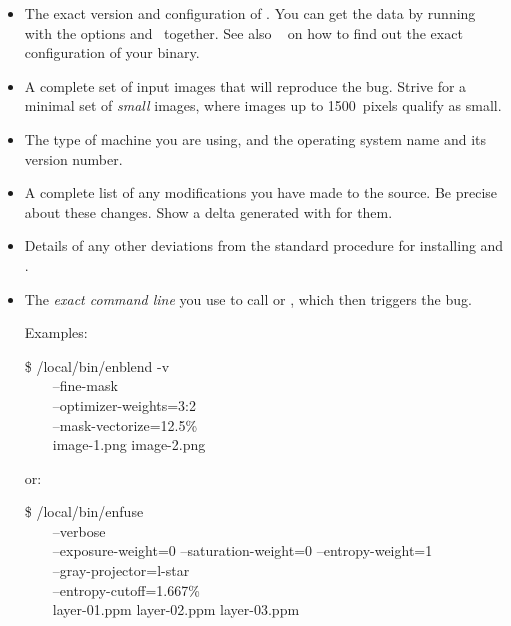 \begin{itemize}
\item
  The exact version and configuration of \App.  You can get the data by running \app{} with the
  options  and~ together.  See also
  \sectionName~ on how to find out the exact configuration of
  your binary.

\item
  A complete set of input images that will reproduce the bug.  Strive for a minimal set of
  \emph{small} images, where images up to 1500~pixels qualify as small.

\item
  The type of machine you are using, and the operating system name and its version number.

\item
  A complete list of any modifications you have made to the source.  Be precise about these
  changes.  Show a delta generated with  for them.

\item
  Details of any other deviations from the standard procedure for installing
   and .

\item
  The \emph{exact command line} you use to call  or ,
  which then triggers the bug.

  Examples:

  \begin{terminal}
    \$ \squiggle/local/bin/enblend -v \bslash \\
    ~~~~--fine-mask \bslash \\
    ~~~~--optimizer-weights=3:2 \bslash \\
    ~~~~--mask-vectorize=12.5\% \bslash \\
    ~~~~image-1.png image-2.png
  \end{terminal}

  or:

  \begin{terminal}
    \$ /local/bin/enfuse \bslash \\
    ~~~~--verbose \bslash \\
    ~~~~--exposure-weight=0 --saturation-weight=0 --entropy-weight=1 \bslash \\
    ~~~~--gray-projector=l-star \bslash \\
    ~~~~--entropy-cutoff=1.667\% \bslash \\
    ~~~~layer-01.ppm layer-02.ppm layer-03.ppm
  \end{terminal}


\end{itemize}
